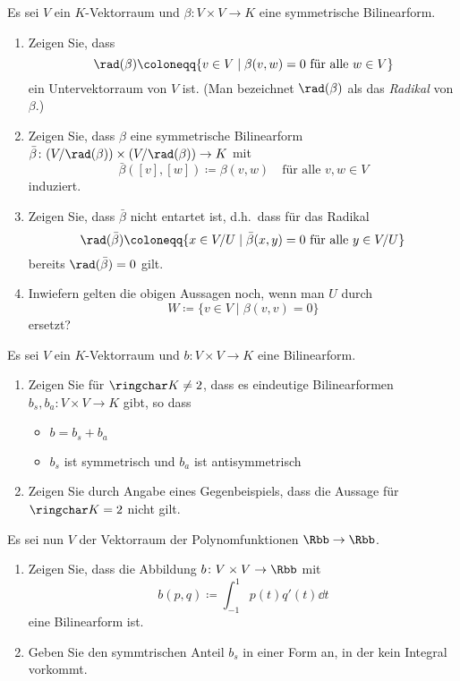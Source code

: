 \begin{question}
  Es sei $V$ ein $K$-Vektorraum und $\beta \colon V \times V \to K$ eine symmetrische Bilinearform.
  \begin{enumerate}[leftmargin=*]
    \item
      Zeigen Sie, dass
      \[
        \rad(\beta) \coloneqq \{ v \in V \mid \text{$\beta(v, w) = 0$ für alle $w \in V$} \}
      \]
      ein Untervektorraum von $V$ ist.
      (Man bezeichnet $\rad(\beta)$ als das \emph{Radikal} von $\beta$.)
    \item
      Zeigen Sie, dass $\beta$ eine symmetrische Bilinearform $\bar{\beta} \colon (V\!/ \rad(\beta)) \times (V\!/\rad(\beta)) \to K$ mit
      \[
        \bar{\beta}([v], [w])
        \coloneqq
        \beta(v,w)
        \quad
        \text{für alle $v, w \in V$}
      \]
      induziert.
    \item
      Zeigen Sie, dass $\bar{\beta}$ nicht entartet ist, d.h.\ dass für das Radikal
      \[
                  \rad(\bar{\beta})
        \coloneqq \{ x \in V\!/U \mid \text{$\bar{\beta}(x,y) = 0$ für alle $y \in V\!/U$} \}
      \]
      bereits $\rad(\bar{\beta}) = 0$ gilt.
    \item
      Inwiefern gelten die obigen Aussagen noch, wenn man $U$ durch
      \[
        W \coloneqq \{v \in V \mid \beta(v,v) = 0\}
      \]
      ersetzt?
  \end{enumerate}
\end{question}


\begin{question}
   Es sei $V$ ein $K$-Vektorraum und $b \colon V \times V \to K$ eine Bilinearform.
  \begin{enumerate}
    \item
      Zeigen Sie für $\ringchar K \neq 2$, dass es eindeutige Bilinearformen $b_s, b_a \colon V \times V \to K$ gibt, so dass
      \begin{itemize}
        \item
          $b = b_s + b_a$
        \item
          $b_s$ ist symmetrisch und $b_a$ ist antisymmetrisch
      \end{itemize}
    \item
      Zeigen Sie durch Angabe eines Gegenbeispiels, dass die Aussage für $\ringchar K = 2$ nicht gilt.
  \end{enumerate}
  Es sei nun $V$ der Vektorraum der Polynomfunktionen $\Rbb \to \Rbb$.
  \begin{enumerate}[resume]
    \item
      Zeigen Sie, dass die Abbildung $b \colon V \times V \to \Rbb$ mit
      \[
        b(p, q) \coloneqq \int_{-1}^1 p(t) q'(t) \dd{t}
      \]
      eine Bilinearform ist.
    \item
      Geben Sie den symmtrischen Anteil $b_s$ in einer Form an, in der kein Integral vorkommt.
  \end{enumerate}
\end{question}


